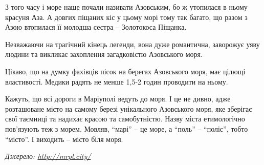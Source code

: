 З того часу і море наше почали називати Азовським, бо ж утопилася в ньому
красуня Аза. А довгих піщаних кіс у цьому морі тому так багато, що разом з Азою
втопилася її молодша сестра – Золотокоса Піщанка.

Незважаючи на трагічний кінець легенди, вона дуже романтична, заворожує уяву
людини та викликає захоплення загадковістю Азовського моря.


Цікаво, що на думку фахівців пісок на берегах Азовського моря, має цілющі
властивості. Медики радять не менше 1,5-2 годин проводити на ньому.

Кажуть, що всі дороги в Маріуполі ведуть до моря. І це не дивно, адже
розташоване місто на самому березі унікального Азовського моря, яке зберігає
свої таємниці та надихає красою та самобутністю. Назву міста етимологічно
пов'язують теж з морем. Мовляв, \enquote{марі} – це море, а \enquote{поль} – \enquote{поліс}, тобто
\enquote{місто}. І виходить – місто біля моря.

\emph{Джерело: \url{http://mrpl.city/}}

